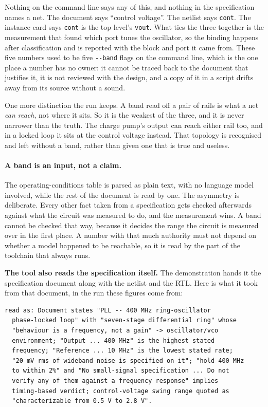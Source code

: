 \documentclass[11pt,a4paper]{article}
\begin{document}
\noindent Nothing on the command line says any of this, and nothing
in the specification names a net. The document says ``control
voltage''. The netlist says \texttt{cont}. The instance card says
\texttt{cont} is the top level's \texttt{vout}. What ties the three
together is the measurement that found which port tunes the
oscillator, so the binding happens after classification and is
reported with the block and port it came from. These five numbers used
to be five \texttt{-{}-band} flags on the command line, which is the
one place a number has no owner: it cannot be traced back to the
document that justifies it, it is not reviewed with the design, and a
copy of it in a script drifts away from its source without a sound.

One more distinction the run keeps. A band read off a pair of rails is
what a net \emph{can reach}, not where it sits. So it is the weakest
of the three, and it is never narrower than the truth. The charge
pump's output can reach either rail too, and in a locked loop it sits
at the control voltage instead. That topology is recognised and left
without a band, rather than given one that is true and useless.

\paragraph{A band is an input, not a claim.} The
operating-conditions table is parsed as plain text, with no language
model involved, while the rest of the document is read by one. The
asymmetry is deliberate. Every other fact taken from a specification
gets checked afterwards against what the circuit was measured to do,
and the measurement wins. A band cannot be checked that way, because
it decides the range the circuit is measured over in the first place.
A number with that much authority must not depend on whether a model
happened to be reachable, so it is read by the part of the toolchain
that always runs.

\textbf{The tool also reads the specification itself.} The
demonstration hands it the specification document along with the
netlist and the RTL. Here is what it took from that document, in the
run these figures come from:

\begin{lstlisting}
read as: Document states "PLL -- 400 MHz ring-oscillator
  phase-locked loop" with "seven-stage differential ring" whose
  "behaviour is a frequency, not a gain" -> oscillator/vco
  environment; "Output ... 400 MHz" is the highest stated
  frequency; "Reference ... 10 MHz" is the lowest stated rate;
  "20 mV rms of wideband noise is specified on it"; "hold 400 MHz
  to within 2%" and "No small-signal specification ... Do not
  verify any of them against a frequency response" implies
  timing-based verdict; control-voltage swing range quoted as
  "characterizable from 0.5 V to 2.8 V".
\end{lstlisting}
\end{document}
